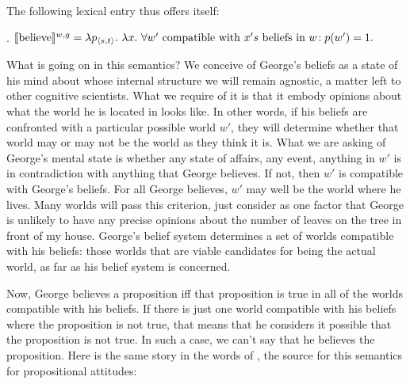 The following lexical entry thus offers itself:

\ex. $\sv{\mbox{believe}}^{w,g} =\\
\null\hfill\lambda p_{\angles{s,t}}.\ \lambda x. \ \forall w' \mbox{ compatible with } x's \mbox{ beliefs in } w\!: p(w') = 1.$

What is going on in this semantics? We conceive of George's beliefs as a state of his mind about whose internal structure we will remain agnostic, a matter left to other cognitive scientists. What we require of it is that it embody opinions about what the world he is located in looks like. In other words, if his beliefs are confronted with a particular possible world $w'$, they will determine whether that world may or may not be the world as they think it is. What we are asking of George's mental state is whether any state of affairs, any event, anything in $w'$ is in contradiction with anything that George believes. If not, then $w'$ is compatible with George's beliefs. For all George believes, $w'$ may well be the world where he lives. Many worlds will pass this criterion, just consider as one factor that George is unlikely to have any precise opinions about the number of leaves on the tree in front of my house. George's belief system determines a set of worlds compatible with his beliefs: those worlds that are viable candidates for being the actual world, as far as his belief system is concerned.

Now, George believes a proposition iff that proposition is true in all of the worlds compatible with his beliefs. If there is just one world compatible with his beliefs where the proposition is not true, that means that he considers it possible that the proposition is not true. In such a case, we can't say that he believes the proposition. Here is the same story in the words of \citet{hintikka:1969:attitudes}, the source for this semantics for propositional attitudes:


